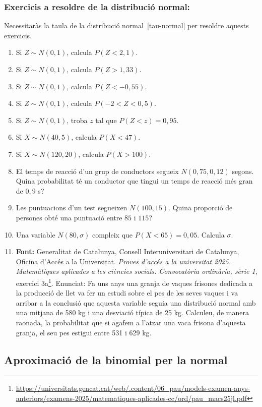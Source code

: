 \subsubsection{Exercicis a resoldre de la distribució normal:}
Necessitaràs la taula de la distribució normal~\ref{tau-normal} per resoldre aquests exercicis.
\begin{enumerate}
 \item Si $Z \sim N(0, 1)$, calcula $P(Z<2,1)$.
 \item Si $Z \sim N(0, 1)$, calcula $P(Z>1,33)$.
 \item Si $Z \sim N(0, 1)$, calcula $P(Z<-0,55)$.
 \item Si $Z \sim N(0, 1)$, calcula $P(-2<Z<0,5)$.
 \item Si $Z \sim N(0, 1)$, troba $z$ tal que $P(Z<z) = 0,95$.
 \item Si $X \sim N(40, 5)$, calcula $P(X<47)$.
 \item Si $X \sim N(120, 20)$, calcula $P(X>100)$.
 \item El temps de reacció d'un grup de conductors segueix $N(0,75, 0,12)$ segons. Quina probabilitat té un conductor que tingui un temps de reacció més gran de $0,9$ s?
 \item Les puntuacions d'un test segueixen $N(100,15)$. Quina proporció de persones obté una puntuació entre $85$ i $115$?
 \item Una variable $N(80,\sigma)$ compleix que $P(X<65)=0,05$. Calcula $\sigma$.
 \item \textbf{Font:} Generalitat de Catalunya, Consell Interuniversitari de Catalunya, Oficina d'Accés a la Universitat. \textit{Proves d'accés a la universitat 2025. Matemàtiques aplicades a les ciències socials. Convocatòria ordinària, sèrie 1}, exercici 3a\footnote{\url{https://universitats.gencat.cat/web/.content/06_pau/models-examen-anys-anteriors/examens-2025/matematiques-aplicades-cc/ord/pau_macs25jl.pdf}}.
    Enunciat: Fa uns anys una granja de vaques frisones dedicada a la producció de llet va fer un estudi sobre el pes de les seves vaques i va arribar a la conclusió que aquesta variable seguia una distribució normal amb una mitjana de 580 kg i una desviació típica de 25 kg. Calculeu, de manera raonada, la probabilitat que si agafem a l’atzar una vaca frisona d’aquesta granja, el seu pes estigui entre 531 i 629 kg.
\end{enumerate}



\subsection{Aproximació de la binomial per la normal}
